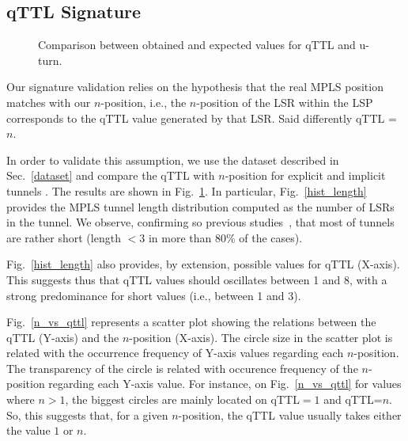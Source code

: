 \subsection{qTTL Signature}\label{validation.qttl}
\begin{figure}[!t]
  \begin{center}
\hspace{-0.3cm}      
  \end{center}
  \caption{Comparison between obtained and expected values for qTTL and u-turn.}
  \label{validation.qttl.fig}
\end{figure}

Our signature validation relies on the hypothesis that the real MPLS position matches
with our $n$-position, i.e., the $n$-position of the LSR within the LSP corresponds 
to the qTTL value generated by that LSR. 
Said differently qTTL = $n$.

In order to validate this assumption, we use the dataset described in
Sec.~\ref{dataset} and compare the qTTL with $n$-position for explicit and implicit tunnels . The results are shown in Fig.~\ref{validation.qttl.fig}.  In
particular, Fig.~\ref{hist_length} provides the MPLS tunnel length distribution
computed as the number of LSRs in the tunnel.  We observe, confirming so
previous studies~\cite{SOM11,Vanaubel15,Donnet12}, that most of tunnels are
rather short (length $< 3$ in more than 80\% of the cases). 

Fig.~\ref{hist_length} also provides, by extension, possible values for qTTL
(X-axis).  This suggests thus that qTTL values should oscillates between 1 and
8, with a strong predominance for short values (i.e., between 1 and 3). 

Fig.~\ref{n_vs_qttl} represents a scatter plot showing the relations between the
qTTL (Y-axis) and the $n$-position (X-axis).  The circle size in the scatter
plot is related with the occurrence frequency of Y-axis values regarding each
$n$-position.  The transparency of the circle is related with occurence
frequency of the $n$-position regarding each Y-axis value.  For instance, on
Fig.~\ref{n_vs_qttl} for values where $n>1$, the biggest circles are mainly
located on qTTL$=1$ and qTTL=$n$.  So, this suggests that, for a given
$n$-position, the qTTL value usually takes either the value $1$ or $n$.

